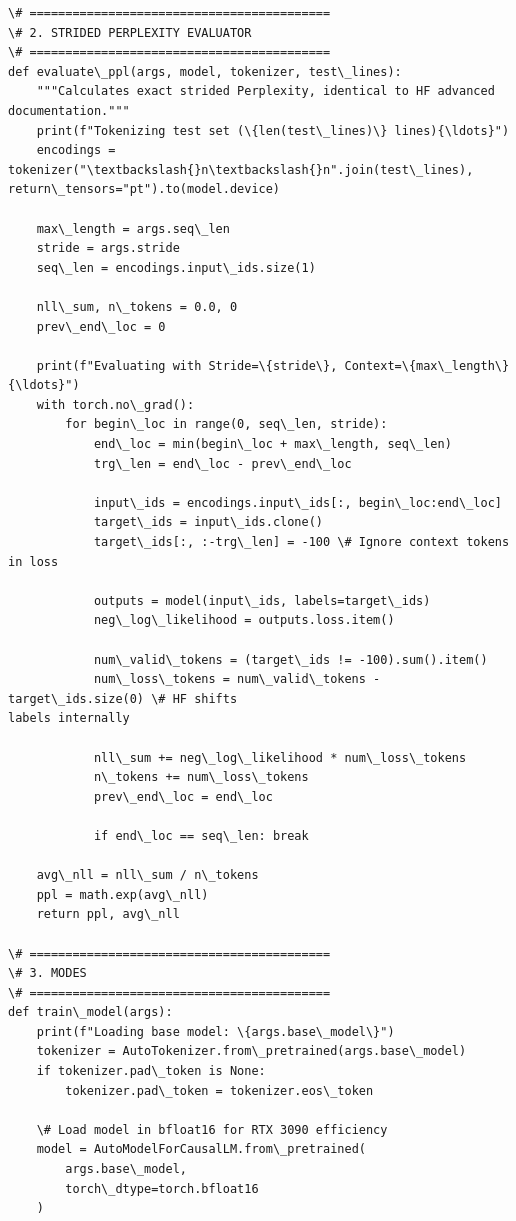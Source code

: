 \documentclass[11pt]{article}
\begin{document}
\begin{Verbatim}[commandchars=\\\{\}]
\# ==========================================
\# 2. STRIDED PERPLEXITY EVALUATOR
\# ==========================================
def evaluate\_ppl(args, model, tokenizer, test\_lines):
    """Calculates exact strided Perplexity, identical to HF advanced
documentation."""
    print(f"Tokenizing test set (\{len(test\_lines)\} lines){\ldots}")
    encodings = tokenizer("\textbackslash{}n\textbackslash{}n".join(test\_lines),
return\_tensors="pt").to(model.device)

    max\_length = args.seq\_len
    stride = args.stride
    seq\_len = encodings.input\_ids.size(1)

    nll\_sum, n\_tokens = 0.0, 0
    prev\_end\_loc = 0

    print(f"Evaluating with Stride=\{stride\}, Context=\{max\_length\}{\ldots}")
    with torch.no\_grad():
        for begin\_loc in range(0, seq\_len, stride):
            end\_loc = min(begin\_loc + max\_length, seq\_len)
            trg\_len = end\_loc - prev\_end\_loc

            input\_ids = encodings.input\_ids[:, begin\_loc:end\_loc]
            target\_ids = input\_ids.clone()
            target\_ids[:, :-trg\_len] = -100 \# Ignore context tokens in loss

            outputs = model(input\_ids, labels=target\_ids)
            neg\_log\_likelihood = outputs.loss.item()

            num\_valid\_tokens = (target\_ids != -100).sum().item()
            num\_loss\_tokens = num\_valid\_tokens - target\_ids.size(0) \# HF shifts
labels internally

            nll\_sum += neg\_log\_likelihood * num\_loss\_tokens
            n\_tokens += num\_loss\_tokens
            prev\_end\_loc = end\_loc

            if end\_loc == seq\_len: break

    avg\_nll = nll\_sum / n\_tokens
    ppl = math.exp(avg\_nll)
    return ppl, avg\_nll

\# ==========================================
\# 3. MODES
\# ==========================================
def train\_model(args):
    print(f"Loading base model: \{args.base\_model\}")
    tokenizer = AutoTokenizer.from\_pretrained(args.base\_model)
    if tokenizer.pad\_token is None:
        tokenizer.pad\_token = tokenizer.eos\_token

    \# Load model in bfloat16 for RTX 3090 efficiency
    model = AutoModelForCausalLM.from\_pretrained(
        args.base\_model,
        torch\_dtype=torch.bfloat16
    )


\end{Verbatim}
\end{document}
